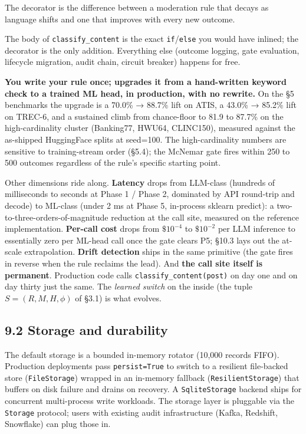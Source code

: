 The decorator is the difference between a moderation rule that decays as
language shifts and one that improves with every new outcome.

The body of \texttt{classify\_content} is the exact
\texttt{if}/\texttt{else} you would have inlined; the decorator is the
only addition. Everything else (outcome logging, gate evaluation,
lifecycle migration, audit chain, circuit breaker) happens for free.

\textbf{You write your rule once; \sysname{} upgrades it from a
hand-written keyword check to a trained ML head, in production, with no
rewrite.} On the §5 benchmarks the upgrade is a 70.0\% → 88.7\% lift on
ATIS, a 43.0\% → 85.2\% lift on TREC-6, and a sustained climb from
chance-floor to 81.9 to 87.7\% on the high-cardinality cluster
(Banking77, HWU64, CLINC150), measured against the as-shipped
HuggingFace splits at seed=100. The high-cardinality numbers are
sensitive to training-stream order (§5.4); the McNemar gate fires within
250 to 500 outcomes regardless of the rule's specific starting point.

Other dimensions ride along. \textbf{Latency} drops from LLM-class
(hundreds of milliseconds to seconds at Phase 1 / Phase 2, dominated by
API round-trip and decode) to ML-class (under 2 ms at Phase 5,
in-process sklearn predict): a two-to-three-orders-of-magnitude
reduction at the call site, measured on the reference implementation.
\textbf{Per-call cost} drops from \(\$10^{-4}\) to \(\$10^{-2}\) per LLM
inference to essentially zero per ML-head call once the gate clears P5;
§10.3 lays out the at-scale extrapolation. \textbf{Drift detection}
ships in the same primitive (the gate fires in reverse when the rule
reclaims the lead). And \textbf{the call site itself is permanent}.
Production code calls \texttt{classify\_content(post)} on day one and on
day thirty just the same. The \emph{learned switch} on the inside (the
tuple \(S = (R, M, H, \phi)\) of §3.1) is what evolves.

\subsection{9.2 Storage and durability}\label{storage-and-durability}

The default storage is a bounded in-memory rotator (10,000 records
FIFO). Production deployments pass \texttt{persist=True} to switch to a
resilient file-backed store (\texttt{FileStorage}) wrapped in an
in-memory fallback (\texttt{ResilientStorage}) that buffers on disk
failure and drains on recovery. A \texttt{SqliteStorage} backend ships
for concurrent multi-process write workloads. The storage layer is
pluggable via the \texttt{Storage} protocol; users with existing audit
infrastructure (Kafka, Redshift, Snowflake) can plug those in.

